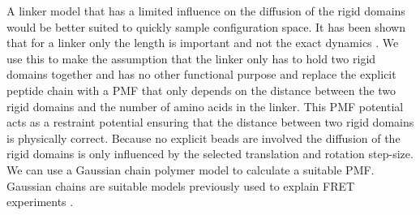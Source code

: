 \documentclass[12pt, twoside]{report}
\begin{document}
A linker model that has a limited influence on the diffusion of the rigid
domains would be better suited to quickly sample configuration space. It has
been shown that for a linker only the length is important and not the exact
dynamics \cite{Rozycki2017}. We use this to make the assumption that the linker
only has to hold two rigid domains together and has no other functional purpose
and replace the explicit peptide chain with a \gls{PMF} that only depends on the
distance between the two rigid domains and the number of amino acids in the
linker. This \gls{PMF} potential acts as a restraint potential ensuring that the
distance between two rigid domains is physically correct. Because no explicit
beads are involved the diffusion of the rigid domains is only influenced by the
selected translation and rotation step-size. We can use a Gaussian chain polymer
model to calculate a suitable \gls{PMF}. Gaussian chains are suitable models
previously used to explain \gls{FRET} experiments \cite{OBrien2009}.
\end{document}
